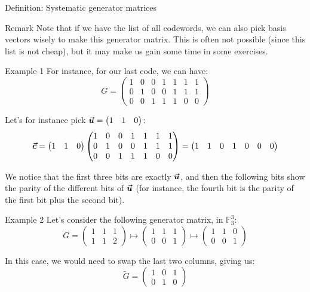 \documentclass[a4paper]{article}
\begin{document}
\begin{parag}{Definition: Systematic generator matrices}
    \begin{subparag}{Remark}
        Note that if we have the list of all codewords, we can also pick basis vectors wisely to make this generator matrix. This is often not possible (since this list is not cheap), but it may make us gain some time in some exercises.
    \end{subparag}
    
\end{parag}

\begin{parag}{Example 1}
    For instance, for our last code, we can have:
    \[G = \begin{pmatrix} 1 & 0 & 0 & 1 & 1 & 1 & 1 \\ 0 & 1 & 0 & 0 & 1 & 1 & 1 \\ 0 & 0 & 1 & 1 & 1 & 0 & 0 \end{pmatrix} \]

    Let's for instance pick $\bm{\protect\vec{u}} = \begin{pmatrix} 1 & 1 & 0 \end{pmatrix} $:
    \[\bm{\protect\vec{c}} = \begin{pmatrix} 1 & 1 & 0 \end{pmatrix} \begin{pmatrix} 1 & 0 & 0 & 1 & 1 & 1 & 1 \\ 0 & 1 & 0 & 0 & 1 & 1 & 1 \\ 0 & 0 & 1 & 1 & 1 & 0 & 0 \end{pmatrix} = \begin{pmatrix} 1 & 1 & 0 & 1 & 0 & 0 & 0 \end{pmatrix} \]

    We notice that the first three bits are exactly $\bm{\protect\vec{u}}$, and then the following bits show the parity of the different bits of $\bm{\protect\vec{u}}$ (for instance, the fourth bit is the parity of the first bit plus the second bit).
\end{parag}

\begin{parag}{Example 2}
    Let's consider the following generator matrix, in $\mathbb{F}_3^3$:
    \[G = \begin{pmatrix} 1 & 1 & 1 \\ 1 & 1 & 2 \end{pmatrix} \mapsto \begin{pmatrix} 1 & 1 & 1 \\ 0 & 0 & 1 \end{pmatrix} \mapsto \begin{pmatrix} 1 & 1 & 0 \\ 0 & 0 & 1 \end{pmatrix} \]

    In this case, we would need to swap the last two columns, giving us: 
    \[\widetilde{G} = \begin{pmatrix} 1 & 0 & 1 \\ 0 & 1 & 0 \end{pmatrix} \]
\end{parag}
\end{document}
